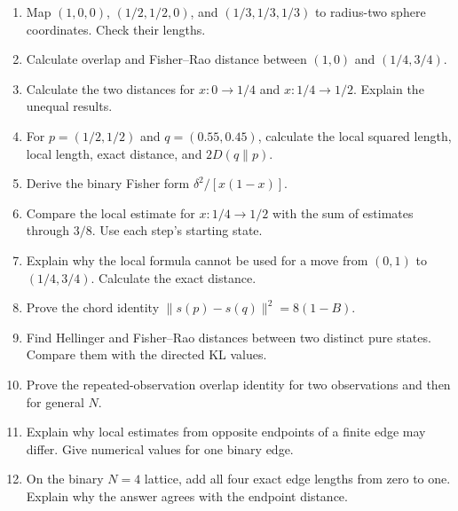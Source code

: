 \documentclass[11pt,oneside,openany]{book}
\theoremstyle{definition}
\theoremstyle{remark}
\newenvironment{exercises}{\begin{enumerate}[label=\thechapter.\arabic*,ref=\thechapter.\arabic*,leftmargin=2.8em,itemsep=6pt]}{\end{enumerate}}
\numberwithin{equation}{chapter}
\begin{document}
\begin{exercises}

\item 

Map \((1,0,0)\), \((1/2,1/2,0)\), and \((1/3,1/3,1/3)\) to radius-two sphere coordinates. Check their lengths.

\item 

Calculate overlap and Fisher--Rao distance between \((1,0)\) and \((1/4,3/4)\).

\item 

Calculate the two distances for \(x:0\to1/4\) and \(x:1/4\to1/2\). Explain the unequal results.

\item 

For \(p=(1/2,1/2)\) and \(q=(0.55,0.45)\), calculate the local squared length, local length, exact distance, and \(2D(q\|p)\).

\item 

Derive the binary Fisher form \(\delta^2/[x(1-x)]\).

\item 

Compare the local estimate for \(x:1/4\to1/2\) with the sum of estimates through \(3/8\). Use each step's starting state.

\item 

Explain why the local formula cannot be used for a move from \((0,1)\) to \((1/4,3/4)\). Calculate the exact distance.

\item 

Prove the chord identity \(\|s(p)-s(q)\|^2=8(1-B)\).

\item 

Find Hellinger and Fisher--Rao distances between two distinct pure states. Compare them with the directed KL values.

\item 

Prove the repeated-observation overlap identity for two observations and then for general \(N\).

\item 

Explain why local estimates from opposite endpoints of a finite edge may differ. Give numerical values for one binary edge.

\item 

On the binary \(N=4\) lattice, add all four exact edge lengths from zero to one. Explain why the answer agrees with the endpoint distance.

\end{exercises}
\end{document}
